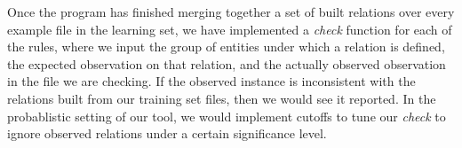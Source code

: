 Once the program has finished merging together a set of built relations over every example file in the learning set, we have implemented a \textit{check} function for each of the rules, where we input the group of entities under which a relation is defined, the expected observation on that relation, and the actually observed observation in the file we are checking. If the observed instance is inconsistent with the relations built from our training set files, then we would see it reported. In the probablistic setting of our tool, we would implement cutoffs to tune our \textit{check} to ignore observed relations under a certain significance level.
\fi
